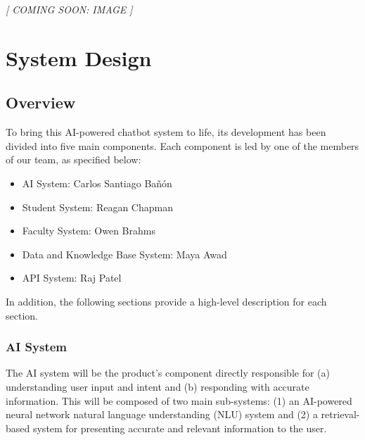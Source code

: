 \documentclass[titlepage, 12pt]{article}
\begin{document}
\begin{center}\emph{[ COMING SOON: IMAGE ]}\end{center}

 

 

 

 



 












\pagebreak


\section{System Design}

\subsection{Overview}

To bring this AI-powered chatbot system to life, its development has been divided into five main components. Each component is led by one of the members of our team, as specified below:

\begin{itemize}
    \item AI System: Carlos Santiago Bañón
    \item Student System: Reagan Chapman
    \item Faculty System: Owen Brahms
    \item Data and Knowledge Base System: Maya Awad
    \item API System: Raj Patel
\end{itemize}

In addition, the following sections provide a high-level description for each section.

\subsubsection{AI System}

The AI system will be the product’s component directly responsible for (a) understanding user input and intent and (b) responding with accurate information. This will be composed of two main sub-systems: (1) an AI-powered neural network natural language understanding (NLU) system and (2) a retrieval-based system for presenting accurate and relevant information to the user.
\end{document}
